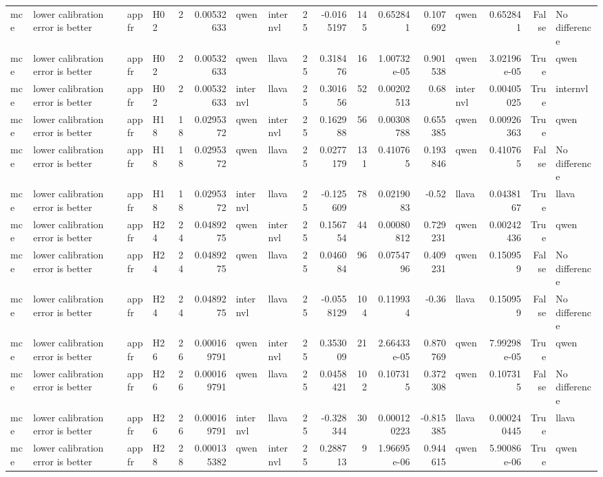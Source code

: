 \begin{longtable}{llllrrllrrrrrlrrl}
mce & lower calibration error is better & appfr & H02 & 2 & 0.00532633 & qwen & internvl & 25 & -0.0165197 & 145 & 0.652841 & 0.107692 & qwen & 0.652841 & False & No difference \\
mce & lower calibration error is better & appfr & H02 & 2 & 0.00532633 & qwen & llava & 25 & 0.318476 & 16 & 1.00732e-05 & 0.901538 & qwen & 3.02196e-05 & True & qwen \\
mce & lower calibration error is better & appfr & H02 & 2 & 0.00532633 & internvl & llava & 25 & 0.301656 & 52 & 0.00202513 & 0.68 & internvl & 0.00405025 & True & internvl \\
mce & lower calibration error is better & appfr & H18 & 18 & 0.0295372 & qwen & internvl & 25 & 0.162988 & 56 & 0.00308788 & 0.655385 & qwen & 0.00926363 & True & qwen \\
mce & lower calibration error is better & appfr & H18 & 18 & 0.0295372 & qwen & llava & 25 & 0.0277179 & 131 & 0.410765 & 0.193846 & qwen & 0.410765 & False & No difference \\
mce & lower calibration error is better & appfr & H18 & 18 & 0.0295372 & internvl & llava & 25 & -0.125609 & 78 & 0.0219083 & -0.52 & llava & 0.0438167 & True & llava \\
mce & lower calibration error is better & appfr & H24 & 24 & 0.0489275 & qwen & internvl & 25 & 0.156754 & 44 & 0.00080812 & 0.729231 & qwen & 0.00242436 & True & qwen \\
mce & lower calibration error is better & appfr & H24 & 24 & 0.0489275 & qwen & llava & 25 & 0.046084 & 96 & 0.0754796 & 0.409231 & qwen & 0.150959 & False & No difference \\
mce & lower calibration error is better & appfr & H24 & 24 & 0.0489275 & internvl & llava & 25 & -0.0558129 & 104 & 0.119934 & -0.36 & llava & 0.150959 & False & No difference \\
mce & lower calibration error is better & appfr & H26 & 26 & 0.000169791 & qwen & internvl & 25 & 0.353009 & 21 & 2.66433e-05 & 0.870769 & qwen & 7.99298e-05 & True & qwen \\
mce & lower calibration error is better & appfr & H26 & 26 & 0.000169791 & qwen & llava & 25 & 0.0458421 & 102 & 0.107315 & 0.372308 & qwen & 0.107315 & False & No difference \\
mce & lower calibration error is better & appfr & H26 & 26 & 0.000169791 & internvl & llava & 25 & -0.328344 & 30 & 0.000120223 & -0.815385 & llava & 0.000240445 & True & llava \\
mce & lower calibration error is better & appfr & H28 & 28 & 0.000135382 & qwen & internvl & 25 & 0.288713 & 9 & 1.96695e-06 & 0.944615 & qwen & 5.90086e-06 & True & qwen \\

\end{longtable}
